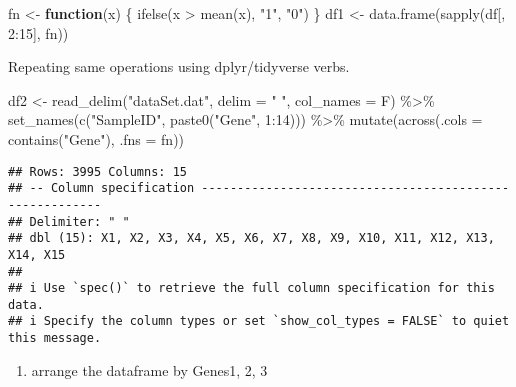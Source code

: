 \documentclass[
]{article}
\newenvironment{Shaded}{\begin{snugshade}}{\end{snugshade}}
\newcommand{\AttributeTok}[1]{\textcolor[rgb]{0.77,0.63,0.00}{#1}}
\newcommand{\ControlFlowTok}[1]{\textcolor[rgb]{0.13,0.29,0.53}{\textbf{#1}}}
\newcommand{\DecValTok}[1]{\textcolor[rgb]{0.00,0.00,0.81}{#1}}
\newcommand{\FunctionTok}[1]{\textcolor[rgb]{0.00,0.00,0.00}{#1}}
\newcommand{\NormalTok}[1]{#1}
\newcommand{\OtherTok}[1]{\textcolor[rgb]{0.56,0.35,0.01}{#1}}
\newcommand{\SpecialCharTok}[1]{\textcolor[rgb]{0.00,0.00,0.00}{#1}}
\newcommand{\StringTok}[1]{\textcolor[rgb]{0.31,0.60,0.02}{#1}}
\providecommand{\tightlist}{%
  \setlength{\itemsep}{0pt}\setlength{\parskip}{0pt}}
\begin{document}
\begin{Shaded}
\begin{Highlighting}[]
\NormalTok{fn }\OtherTok{\textless{}{-}} \ControlFlowTok{function}\NormalTok{(x) \{}
    \FunctionTok{ifelse}\NormalTok{(x }\SpecialCharTok{\textgreater{}} \FunctionTok{mean}\NormalTok{(x), }\StringTok{"1"}\NormalTok{, }\StringTok{"0"}\NormalTok{)}
\NormalTok{\}}
\NormalTok{df1 }\OtherTok{\textless{}{-}} \FunctionTok{data.frame}\NormalTok{(}\FunctionTok{sapply}\NormalTok{(df[, }\DecValTok{2}\SpecialCharTok{:}\DecValTok{15}\NormalTok{], fn))}
\end{Highlighting}
\end{Shaded}

Repeating same operations using dplyr/tidyverse verbs.

\begin{Shaded}
\begin{Highlighting}[]
\NormalTok{df2 }\OtherTok{\textless{}{-}} \FunctionTok{read\_delim}\NormalTok{(}\StringTok{"dataSet.dat"}\NormalTok{, }\AttributeTok{delim =} \StringTok{" "}\NormalTok{, }\AttributeTok{col\_names =}\NormalTok{ F) }\SpecialCharTok{\%\textgreater{}\%}
    \FunctionTok{set\_names}\NormalTok{(}\FunctionTok{c}\NormalTok{(}\StringTok{"SampleID"}\NormalTok{, }\FunctionTok{paste0}\NormalTok{(}\StringTok{"Gene"}\NormalTok{, }\DecValTok{1}\SpecialCharTok{:}\DecValTok{14}\NormalTok{))) }\SpecialCharTok{\%\textgreater{}\%}
    \FunctionTok{mutate}\NormalTok{(}\FunctionTok{across}\NormalTok{(}\AttributeTok{.cols =} \FunctionTok{contains}\NormalTok{(}\StringTok{"Gene"}\NormalTok{), }\AttributeTok{.fns =}\NormalTok{ fn))}
\end{Highlighting}
\end{Shaded}

\begin{verbatim}
## Rows: 3995 Columns: 15
## -- Column specification --------------------------------------------------------
## Delimiter: " "
## dbl (15): X1, X2, X3, X4, X5, X6, X7, X8, X9, X10, X11, X12, X13, X14, X15
## 
## i Use `spec()` to retrieve the full column specification for this data.
## i Specify the column types or set `show_col_types = FALSE` to quiet this message.
\end{verbatim}

\begin{enumerate}
\def\labelenumi{\arabic{enumi}.}
\setcounter{enumi}{1}
\tightlist
\item
  arrange the dataframe by Genes1, 2, 3
\end{enumerate}
\end{document}
